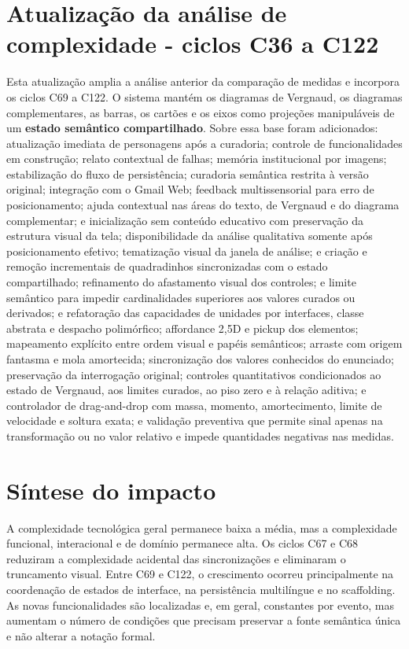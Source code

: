 \documentclass[12pt,a4paper]{article}
\begin{document}
\section*{Atualização da análise de complexidade - ciclos C36 a C122}

Esta atualização amplia a análise anterior da comparação de medidas e incorpora os ciclos C69 a C122. O sistema mantém os diagramas de Vergnaud, os diagramas complementares, as barras, os cartões e os eixos como projeções manipuláveis de um \textbf{estado semântico compartilhado}. Sobre essa base foram adicionados: atualização imediata de personagens após a curadoria; controle de funcionalidades em construção; relato contextual de falhas; memória institucional por imagens; estabilização do fluxo de persistência; curadoria semântica restrita à versão original; integração com o Gmail Web; feedback multissensorial para erro de posicionamento; ajuda contextual nas áreas do texto, de Vergnaud e do diagrama complementar; e inicialização sem conteúdo educativo com preservação da estrutura visual da tela; disponibilidade da análise qualitativa somente após posicionamento efetivo; tematização visual da janela de análise; e criação e remoção incrementais de quadradinhos sincronizadas com o estado compartilhado; refinamento do afastamento visual dos controles; e limite semântico para impedir cardinalidades superiores aos valores curados ou derivados; e refatoração das capacidades de unidades por interfaces, classe abstrata e despacho polimórfico; affordance 2,5D e pickup dos elementos; mapeamento explícito entre ordem visual e papéis semânticos; arraste com origem fantasma e mola amortecida; sincronização dos valores conhecidos do enunciado; preservação da interrogação original; controles quantitativos condicionados ao estado de Vergnaud, aos limites curados, ao piso zero e à relação aditiva; e controlador de drag-and-drop com massa, momento, amortecimento, limite de velocidade e soltura exata; e validação preventiva que permite sinal apenas na transformação ou no valor relativo e impede quantidades negativas nas medidas.

\section{Síntese do impacto}

A complexidade tecnológica geral permanece baixa a média, mas a complexidade funcional, interacional e de domínio permanece alta. Os ciclos C67 e C68 reduziram a complexidade acidental das sincronizações e eliminaram o truncamento visual. Entre C69 e C122, o crescimento ocorreu principalmente na coordenação de estados de interface, na persistência multilíngue e no scaffolding. As novas funcionalidades são localizadas e, em geral, constantes por evento, mas aumentam o número de condições que precisam preservar a fonte semântica única e não alterar a notação formal.
\end{document}
